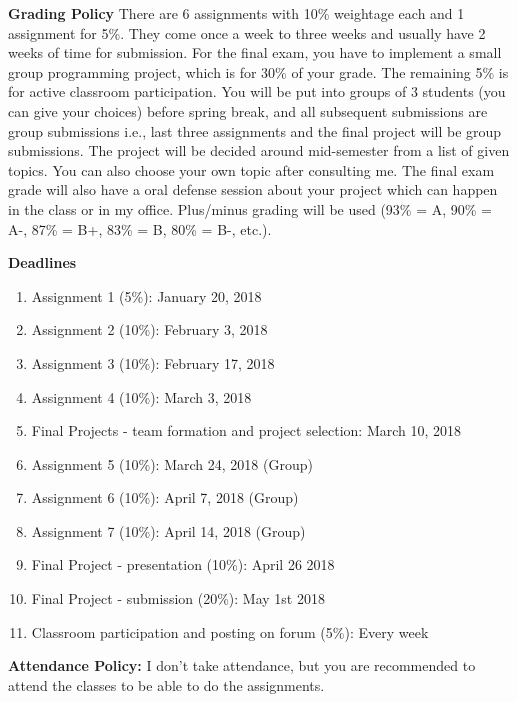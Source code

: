 \documentclass[11pt,a4paper]{article}
\begin{document}
\bigskip\textbf{\large Grading Policy}
There are 6 assignments with 10\% weightage each and 1 assignment for 5\%. They come once a week to three weeks and usually have 2 weeks of time for submission. For the final exam, you have to implement a small group programming project, which is for 30\% of your grade. The remaining 5\% is for active classroom participation. You will be put into groups of 3 students (you can give your choices) before spring break, and all subsequent submissions are group submissions i.e., last three assignments and the final project will be group submissions. The project will be decided around mid-semester from a list of given topics. You can also choose your own topic after consulting me. The final exam grade will also have a oral defense session about your project which can happen in the class or in my office. Plus/minus grading will be used (93\% = A, 90\% = A-, 87\% = B+, 83\% = B, 80\% = B-, etc.). 

\bigskip\textbf{\large Deadlines}
\begin{enumerate}
\item Assignment 1 (5\%): January 20, 2018 %
\item Assignment 2 (10\%): February 3, 2018 %
\item Assignment 3 (10\%): February 17, 2018 %
\item Assignment 4 (10\%): March 3, 2018  %
\item Final Projects - team formation and project selection: March 10, 2018
\item Assignment 5 (10\%): March 24, 2018 (Group) %
\item Assignment 6 (10\%): April 7, 2018 (Group) %
\item Assignment 7 (10\%): April 14, 2018 (Group) %
\item Final Project - presentation (10\%): April 26 2018 
\item Final Project - submission (20\%): May 1st 2018 
\item Classroom participation and posting on forum (5\%): Every week
\end{enumerate}

\bigskip\textbf{\large Attendance Policy: } I don't take attendance, but you are recommended to attend the classes to be able to do the assignments. 
\end{document}
